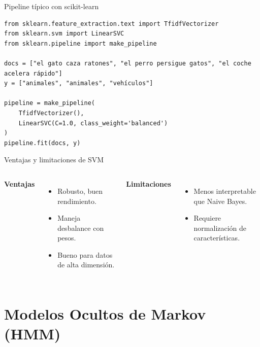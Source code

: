 \documentclass[aspectratio=169, 10pt, xcolor=table]{beamer}
\begin{document}
\begin{frame}[fragile]{Pipeline típico con scikit-learn}
    \begin{lstlisting}
from sklearn.feature_extraction.text import TfidfVectorizer
from sklearn.svm import LinearSVC
from sklearn.pipeline import make_pipeline

docs = ["el gato caza ratones", "el perro persigue gatos", "el coche acelera rápido"]
y = ["animales", "animales", "vehículos"]

pipeline = make_pipeline(
    TfidfVectorizer(),
    LinearSVC(C=1.0, class_weight='balanced')
)
pipeline.fit(docs, y)
    \end{lstlisting}
\end{frame}

\begin{frame}{Ventajas y limitaciones de SVM}
    \begin{columns}[t]
        \textbf{Ventajas}
        \begin{itemize}
            \item Robusto, buen rendimiento.
            \item Maneja desbalance con pesos.
            \item Bueno para datos de alta dimensión.
        \end{itemize}
        \textbf{Limitaciones}
        \begin{itemize}
            \item Menos interpretable que Naive Bayes.
            \item Requiere normalización de características.
        \end{itemize}
    \end{columns}
\end{frame}

\section{Modelos Ocultos de Markov (HMM)}
\end{document}
